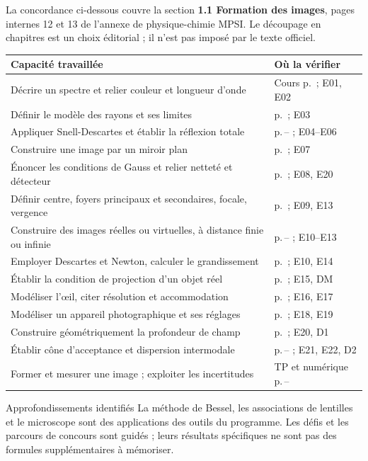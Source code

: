 La concordance ci-dessous couvre la section \textbf{1.1 Formation des images}, pages internes 12 et 13 de l'annexe de physique-chimie MPSI. Le découpage en chapitres est un choix éditorial ; il n'est pas imposé par le texte officiel.
\begingroup\small\renewcommand{\arraystretch}{1.35}
\begin{tabularx}{\linewidth}{@{}Y p{43mm}@{}}
\toprule
Capacité travaillée & Où la vérifier\\\midrule
Décrire un spectre et relier couleur et longueur d'onde & Cours p.\,\pageref{c-sources} ; E01, E02\\
Définir le modèle des rayons et ses limites & p.\,\pageref{c-modele} ; E03\\
Appliquer Snell-Descartes et établir la réflexion totale & p.\,\pageref{c-lois}--\pageref{c-totale} ; E04--E06\\
Construire une image par un miroir plan & p.\,\pageref{c-miroir} ; E07\\
Énoncer les conditions de Gauss et relier netteté et détecteur & p.\,\pageref{c-gauss} ; E08, E20\\
Définir centre, foyers principaux et secondaires, focale, vergence & p.\,\pageref{c-rayons} ; E09, E13\\
Construire des images réelles ou virtuelles, à distance finie ou infinie & p.\,\pageref{c-reelle}--\pageref{c-virtuelle} ; E10--E13\\
Employer Descartes et Newton, calculer le grandissement & p.\,\pageref{c-newton} ; E10, E14\\
Établir la condition de projection d'un objet réel & p.\,\pageref{c-projection} ; E15, DM\\
Modéliser l'œil, citer résolution et accommodation & p.\,\pageref{c-oeil} ; E16, E17\\
Modéliser un appareil photographique et ses réglages & p.\,\pageref{c-photo} ; E18, E19\\
Construire géométriquement la profondeur de champ & p.\,\pageref{c-profondeur} ; E20, D1\\
Établir cône d'acceptance et dispersion intermodale & p.\,\pageref{c-fibre}--\pageref{c-dispersion} ; E21, E22, D2\\
Former et mesurer une image ; exploiter les incertitudes & TP et numérique p.\,\pageref{c-tp}--\pageref{c-numerique}\\
\bottomrule
\end{tabularx}\endgroup
\begin{methode}{Approfondissements identifiés}
La méthode de Bessel, les associations de lentilles et le microscope sont des applications des outils du programme. Les défis et les parcours de concours sont guidés ; leurs résultats spécifiques ne sont pas des formules supplémentaires à mémoriser.
\end{methode}

